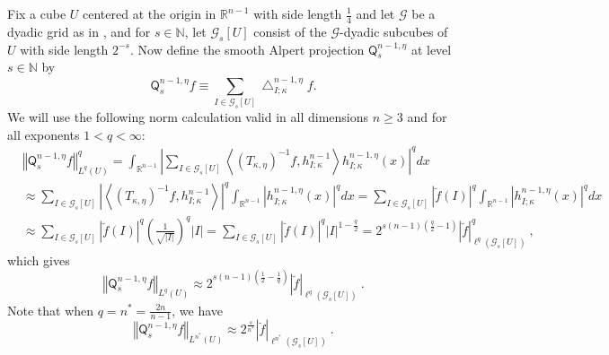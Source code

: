\documentclass{amsart}%
\theoremstyle{plain}
\numberwithin{equation}{section}
\begin{document}
Fix a cube $U$ centered at the origin in $\mathbb{R}^{n-1}$ with side length
$\frac{1}{4}$ and let $\mathcal{G}$ be a dyadic grid as in \cite{Saw7}, and
for $s\in\mathbb{N}$, let $\mathcal{G}_{s}\left[  U\right]  $ consist of the
$\mathcal{G}$-dyadic subcubes of $U$ with side length $2^{-s}$. Now define the
smooth Alpert projection $\mathsf{Q}_{s}^{n-1,\eta}$ at level $s\in\mathbb{N}$
by%
\[
\mathsf{Q}_{s}^{n-1,\eta}f\equiv\sum_{I\in\mathcal{G}_{s}\left[  U\right]
}\bigtriangleup_{I;\kappa}^{n-1,\eta}f.
\]
We will use the following norm calculation valid in all dimensions $n\geq3$
and for all exponents $1<q<\infty$:%
\begin{align*}
&  \left\Vert \mathsf{Q}_{s}^{n-1,\eta}f\right\Vert _{L^{q}\left(  U\right)
}^{q}=\int_{\mathbb{R}^{n-1}}\left\vert \sum_{I\in\mathcal{G}_{s}\left[
U\right]  }\left\langle \left(  T_{\kappa,\eta}\right)  ^{-1}f,h_{I;\kappa
}^{n-1}\right\rangle h_{I;\kappa}^{n-1,\eta}\left(  x\right)  \right\vert
^{q}dx\\
&  \approx\sum_{I\in\mathcal{G}_{s}\left[  U\right]  }\left\vert \left\langle
\left(  T_{\kappa,\eta}\right)  ^{-1}f,h_{I;\kappa}^{n-1}\right\rangle
\right\vert ^{q}\int_{\mathbb{R}^{n-1}}\left\vert h_{I;\kappa}^{n-1,\eta
}\left(  x\right)  \right\vert ^{q}dx=\sum_{I\in\mathcal{G}_{s}\left[
U\right]  }\left\vert \breve{f}\left(  I\right)  \right\vert ^{q}%
\int_{\mathbb{R}^{n-1}}\left\vert h_{I;\kappa}^{n-1,\eta}\left(  x\right)
\right\vert ^{q}dx\\
&  \approx\sum_{I\in\mathcal{G}_{s}\left[  U\right]  }\left\vert \breve
{f}\left(  I\right)  \right\vert ^{q}\left(  \frac{1}{\sqrt{\left\vert
I\right\vert }}\right)  ^{q}\left\vert I\right\vert =\sum_{I\in\mathcal{G}%
_{s}\left[  U\right]  }\left\vert \breve{f}\left(  I\right)  \right\vert
^{q}\left\vert I\right\vert ^{1-\frac{q}{2}}=2^{s\left(  n-1\right)  \left(
\frac{q}{2}-1\right)  }\left\vert \breve{f}\right\vert _{\ell^{q}\left(
\mathcal{G}_{s}\left[  U\right]  \right)  }^{q}\ ,
\end{align*}
which gives%
\begin{equation}
\left\Vert \mathsf{Q}_{s}^{n-1,\eta}f\right\Vert _{L^{q}\left(  U\right)
}\approx2^{s\left(  n-1\right)  \left(  \frac{1}{2}-\frac{1}{q}\right)
}\left\vert \breve{f}\right\vert _{\ell^{q}\left(  \mathcal{G}_{s}\left[
U\right]  \right)  }\ .\label{norm f}%
\end{equation}
Note that when $q=n^{\ast}=\frac{2n}{n-1}$, we have%
\begin{equation}
\left\Vert \mathsf{Q}_{s}^{n-1,\eta}f\right\Vert _{L^{n^{\ast}}\left(
U\right)  }\approx2^{\frac{s}{n^{\ast}}}\left\vert \breve{f}\right\vert
_{\ell^{n^{\ast}}\left(  \mathcal{G}_{s}\left[  U\right]  \right)
}\ .\label{n star}%
\end{equation}
\end{document}
